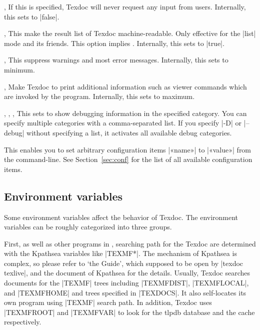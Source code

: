 \documentclass{texdoc-doc}
\begin{document}
\begin{clopt}{, }
If this is specified, Texdoc will never request any input from users.
Internally, this sets  to |false|.
\end{clopt}

\begin{clopt}{, }
This make the result list of Texdoc machine-readable. Only effective for the
|list| mode and its friends. This option implies .
Internally, this sets  to |true|.
\end{clopt}

\begin{clopt}{, }
This suppress warnings and most error messages. Internally, this sets
 to minimum.
\end{clopt}

\begin{clopt}{, }
Make Texdoc to print additional information such as viewer commands which are
invoked by the program. Internally, this sets  to maximum.
\end{clopt}

\begin{clopt}{%
  , ,
  , }
This sets  to show debugging information in the specified
category. You can specify multiple categories with a comma-separated list. If
you specify |-D| or |--debug| without specifying a list, it activates all
available debug categories.
\end{clopt}

\begin{clopt}{}
This enables you to set arbitrary configuration items |«name»| to |«value»|
from the command-line. See Section~\ref{sec:conf} for the list of all available
configuration items.
\end{clopt}

\subsection{Environment variables}
\label{sec:envvar}

Some environment variables affect the behavior of Texdoc. The environment
variables can be roughly categorized into three groups.

First, as well as other programs in {\TL}, searching path for the Texdoc are
determined with the Kpathsea variables like |TEXMF*|. The mechanism of Kpathsea
is complex, so please refer to `the {\TL} Guide', which supposed to be open by
|texdoc texlive|, and the document of Kpathsea for the details. Usually, Texdoc
searches documents for the |TEXMF| trees including |TEXMFDIST|, |TEXMFLOCAL|,
and |TEXMFHOME| and trees specified in |TEXDOCS|. It also self-locates its own
program using |TEXMF| search path. In addition, Texdoc uses |TEXMFROOT| and
|TEXMFVAR| to look for the tlpdb database and the cache respectively.
\end{document}
